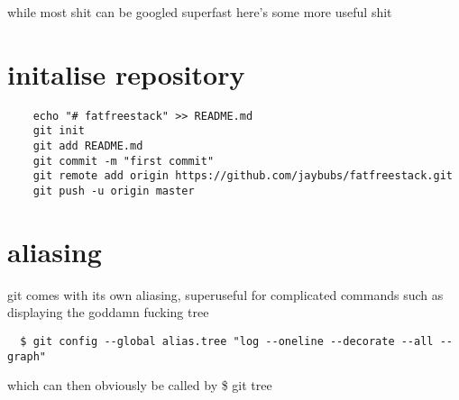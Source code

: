 while most shit can be googled superfast here's some more useful shit

\section{initalise repository}%
\label{sec:initalise_repository}

\begin{verbatim}
	echo "# fatfreestack" >> README.md
	git init
	git add README.md
	git commit -m "first commit"
	git remote add origin https://github.com/jaybubs/fatfreestack.git
	git push -u origin master
\end{verbatim}

\section{aliasing}%
\label{sec:aliasing}

git comes with its own aliasing, superuseful for complicated commands such as displaying  the goddamn fucking tree

\begin{verbatim}
  $ git config --global alias.tree "log --oneline --decorate --all --graph"
\end{verbatim}
which can then obviously be called by \$ git tree
